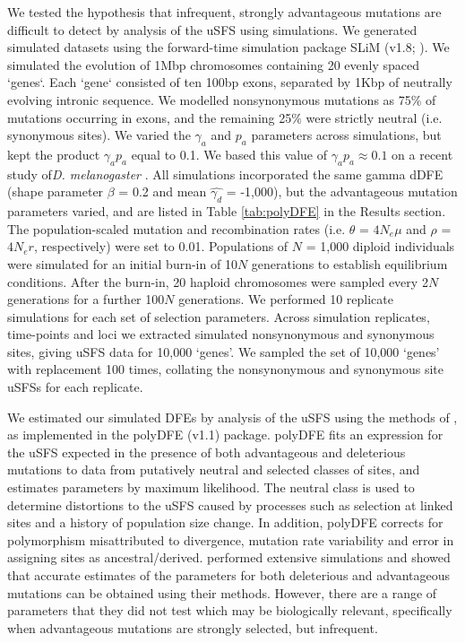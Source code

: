 	We tested the hypothesis that infrequent, strongly advantageous mutations are difficult to detect by analysis of the uSFS using simulations. We generated simulated datasets using the forward-time simulation package SLiM (v1.8; \citealt{RN148}). We simulated the evolution of 1Mbp chromosomes containing 20 evenly spaced  `genes`. Each `gene` consisted of ten 100bp exons, separated by 1Kbp of neutrally evolving intronic sequence. We modelled nonsynonymous mutations as 75\% of mutations occurring in exons, and the remaining 25\% were strictly neutral (i.e. synonymous sites). We varied the $\gamma_a$ and $p_a$ parameters across simulations, but kept the product $\gamma_a p_a$ equal to 0.1. We based this value of $\gamma_a p_a \approx 0.1$ on a recent study of\textit{D. melanogaster} \citep{RN321}. All simulations incorporated the same gamma dDFE (shape parameter $\beta$ = 0.2 and mean $\hat{\gamma_d}$ = -1,000), but the advantageous mutation parameters varied, and are listed in Table \ref{tab:polyDFE} in the Results section. The population-scaled mutation and recombination rates (i.e. $\theta$ = \emph{$4N_{e}\mu$} and $\rho$ = \emph{$4N_{e}r$}, respectively) were set to 0.01. Populations of $N$ = 1,000 diploid individuals were simulated for an initial burn-in of 10$N$ generations to establish equilibrium conditions. After the burn-in, 20 haploid chromosomes were sampled every 2$N$ generations for a further 100$N$ generations. We performed 10 replicate simulations for each set of selection parameters. Across simulation replicates, time-points and loci we extracted simulated nonsynonymous and synonymous sites, giving uSFS data for 10,000 `genes'. We sampled the set of 10,000 `genes' with replacement 100 times, collating the nonsynonymous and synonymous site uSFSs for each replicate.
	
	We estimated our simulated DFEs by analysis of the uSFS using the methods of \cite{RN354}, as implemented in the polyDFE (v1.1) package. polyDFE fits an expression for the uSFS expected in the presence of both advantageous and deleterious mutations to data from putatively neutral and selected classes of sites, and estimates parameters by maximum likelihood. The neutral class is used to determine distortions to the uSFS caused by processes such as selection at linked sites and a history of population size change. In addition, polyDFE corrects for polymorphism misattributed to divergence, mutation rate variability and error in assigning sites as ancestral/derived. \cite{RN354} performed extensive simulations and showed that accurate estimates of the parameters for both deleterious and advantageous mutations can be obtained using their methods. However, there are a range of parameters that they did not test which may be biologically relevant, specifically when advantageous mutations are strongly selected, but infrequent.

